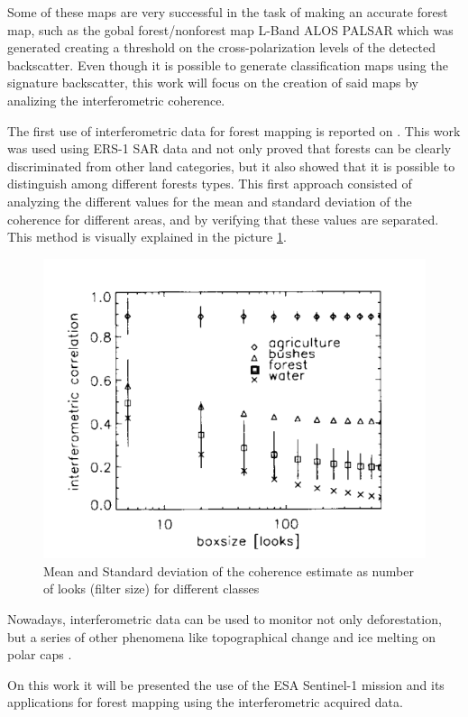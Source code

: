 Some of these maps are very successful in the task of making an accurate forest map, such as the gobal forest/nonforest map L-Band ALOS PALSAR which was generated creating a threshold on the cross-polarization levels of the detected backscatter. Even though it is possible to generate classification maps using the signature backscatter, this work will focus on the creation of said maps by analizing the interferometric coherence.

The first use of interferometric data for forest mapping is reported on \cite{first_interferometric}. This work was used using ERS-1 SAR data and not only proved that forests can be clearly discriminated from other land categories, but it also showed that it is possible to distinguish among different forests types. This first approach consisted of analyzing the different values for the mean and standard deviation of the coherence for different areas, and by verifying that these values are separated. This method is visually explained in the picture \ref{fig:first_interferometric_estimate}.

\begin{figure}[H]
    \centering
    \includegraphics[width=0.7\linewidth]{Cap2/first_interferometric.png}
    \caption{Mean and Standard deviation of the coherence estimate as number of looks (filter size) for different classes}
    \label{fig:first_interferometric_estimate}
\end{figure}

Nowadays, interferometric data can be used to monitor not only deforestation, but a series of other phenomena like topographical change and ice melting on polar caps \cite{Paolathesis}. 

On this work it will be presented the use of the ESA Sentinel-1 mission and its applications for forest mapping using the interferometric acquired data.

